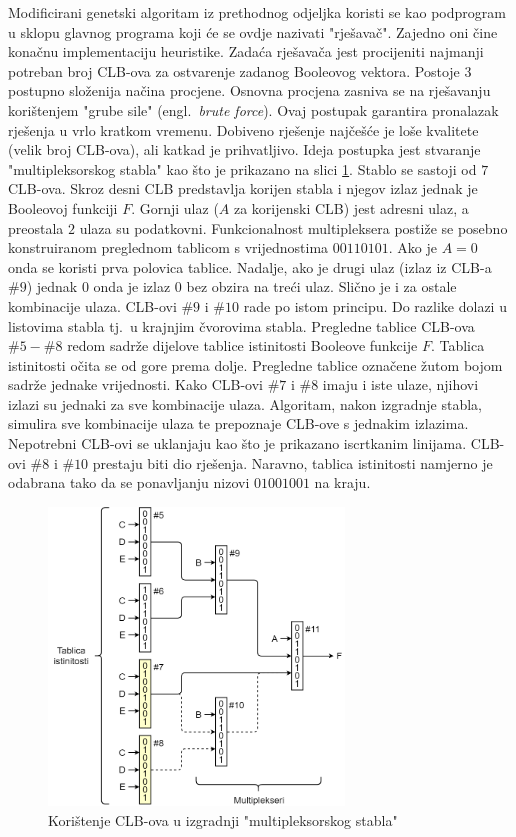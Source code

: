 \documentclass[times, utf8, diplomski]{fer}
\begin{document}
Modificirani genetski algoritam iz prethodnog odjeljka koristi se kao podprogram u sklopu glavnog programa koji će se ovdje nazivati "rješavač". Zajedno oni čine konačnu implementaciju heuristike. Zadaća rješavača jest procijeniti najmanji potreban broj CLB-ova za ostvarenje zadanog Booleovog vektora. Postoje $3$ postupno složenija načina procjene. Osnovna procjena zasniva se na rješavanju korištenjem "grube sile" (engl.~\textit{brute force}). Ovaj postupak garantira pronalazak rješenja u vrlo kratkom vremenu. Dobiveno rješenje najčešće je loše kvalitete (velik broj CLB-ova), ali katkad je prihvatljivo. Ideja postupka jest stvaranje "multipleksorskog stabla" kao što je prikazano na slici \ref{fig:brute}. Stablo se sastoji od $7$ CLB-ova. Skroz desni CLB predstavlja korijen stabla i njegov izlaz jednak je Booleovoj funkciji $F$. Gornji ulaz ($A$ za korijenski CLB) jest adresni ulaz, a preostala $2$ ulaza su podatkovni. Funkcionalnost multipleksera postiže se posebno konstruiranom preglednom tablicom s vrijednostima $00110101$. Ako je $A=0$ onda se koristi prva polovica tablice. Nadalje, ako je drugi ulaz (izlaz iz CLB-a $\#9$) jednak $0$ onda je izlaz $0$ bez obzira na treći ulaz. Slično je i za ostale kombinacije ulaza. CLB-ovi $\#9$ i $\#10$ rade po istom principu. Do razlike dolazi u listovima stabla tj.~u krajnjim čvorovima stabla. Pregledne tablice CLB-ova $\#5-\#8$ redom sadrže dijelove tablice istinitosti Booleove funkcije $F$. Tablica istinitosti očita se od gore prema dolje. Pregledne tablice označene žutom bojom sadrže jednake vrijednosti. Kako CLB-ovi $\#7$ i $\#8$ imaju i iste ulaze, njihovi izlazi su jednaki za sve kombinacije ulaza. Algoritam, nakon izgradnje stabla, simulira sve kombinacije ulaza te prepoznaje CLB-ove s jednakim izlazima. Nepotrebni CLB-ovi se uklanjaju kao što je prikazano iscrtkanim linijama. CLB-ovi $\#8$ i $\#10$ prestaju biti dio rješenja. Naravno, tablica istinitosti namjerno je odabrana tako da se ponavljanju nizovi $01001001$ na kraju.

\begin{figure}[htb]
	\centering
	\includegraphics[width=0.7\textwidth]{img/brute.png}
	\caption{Korištenje CLB-ova u izgradnji "multipleksorskog stabla"}
	\label{fig:brute}
\end{figure}
\end{document}
